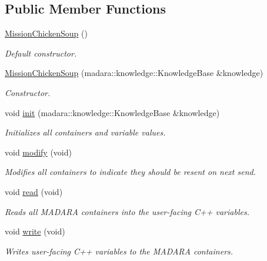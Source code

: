 \subsection*{Public Member Functions}
\begin{DoxyCompactItemize}
\item 
\hyperlink{classcontainers_1_1MissionChickenSoup_ac7407f867e06338f01d09dce2583887a}{Mission\+Chicken\+Soup} ()
\begin{DoxyCompactList}\small\item\em Default constructor. \end{DoxyCompactList}\item 
\hyperlink{classcontainers_1_1MissionChickenSoup_a5f7a361d8f6375ff5568bc021ca3992e}{Mission\+Chicken\+Soup} (madara\+::knowledge\+::\+Knowledge\+Base \&knowledge)
\begin{DoxyCompactList}\small\item\em Constructor. \end{DoxyCompactList}\item 
void \hyperlink{classcontainers_1_1MissionChickenSoup_a4d5f5baaf50ae3b6b385c8bb46db1a76}{init} (madara\+::knowledge\+::\+Knowledge\+Base \&knowledge)
\begin{DoxyCompactList}\small\item\em Initializes all containers and variable values. \end{DoxyCompactList}\item 
void \hyperlink{classcontainers_1_1MissionChickenSoup_aa735275f3e25d9576b3a6353a645f738}{modify} (void)
\begin{DoxyCompactList}\small\item\em Modifies all containers to indicate they should be resent on next send. \end{DoxyCompactList}\item 
void \hyperlink{classcontainers_1_1MissionChickenSoup_ac319178fa55235e383728e33ea44915d}{read} (void)
\begin{DoxyCompactList}\small\item\em Reads all M\+A\+D\+A\+RA containers into the user-\/facing C++ variables. \end{DoxyCompactList}\item 
void \hyperlink{classcontainers_1_1MissionChickenSoup_a23ec50e0d72093b3f9f6cb4ba58341c3}{write} (void)
\begin{DoxyCompactList}\small\item\em Writes user-\/facing C++ variables to the M\+A\+D\+A\+RA containers. \end{DoxyCompactList}\end{DoxyCompactItemize}
